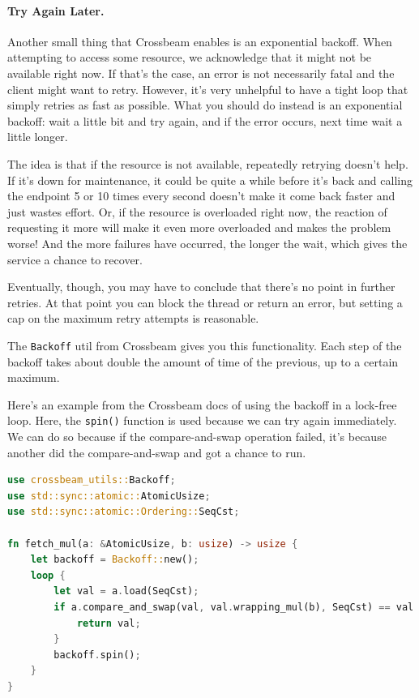 \documentclass[a4paper]{report}
\begin{document}
\begin{appendices}
\paragraph{Try Again Later.}
Another small thing that Crossbeam enables is an exponential backoff. When attempting to access some resource, we acknowledge that it might not be available right now. If that's the case, an error is not necessarily fatal and the client might want to retry. However, it's very unhelpful to have a tight loop that simply retries as fast as possible. What you should do instead is an exponential backoff: wait a little bit and try again, and if the error occurs, next time wait a little longer.

The idea is that if the resource is not available, repeatedly retrying doesn't help. If it's down for maintenance, it could be quite a while before it's back and calling the endpoint 5 or 10 times every second doesn't make it come back faster and just wastes effort. Or, if the resource is overloaded right now, the reaction of requesting it more will make it even more overloaded and makes the problem worse! And the more failures have occurred, the longer the wait, which gives the service a chance to recover.

Eventually, though, you may have to conclude that there's no point in further retries. At that point you can block the thread or return an error, but setting a cap on the maximum retry attempts is reasonable.

The \texttt{Backoff} util from Crossbeam gives you this functionality. Each step of the backoff takes about double the amount of time of the previous, up to a certain maximum.

Here's an example from the Crossbeam docs of using the backoff in a lock-free loop. Here, the \texttt{spin()} function is used because we can try again immediately. We can do so because if the compare-and-swap operation failed, it's because another did the compare-and-swap and got a chance to run.
\begin{lstlisting}[language=Rust]
use crossbeam_utils::Backoff;
use std::sync::atomic::AtomicUsize;
use std::sync::atomic::Ordering::SeqCst;

fn fetch_mul(a: &AtomicUsize, b: usize) -> usize {
    let backoff = Backoff::new();
    loop {
        let val = a.load(SeqCst);
        if a.compare_and_swap(val, val.wrapping_mul(b), SeqCst) == val {
            return val;
        }
        backoff.spin();
    }
}
\end{lstlisting}


\end{appendices}
\end{document}

